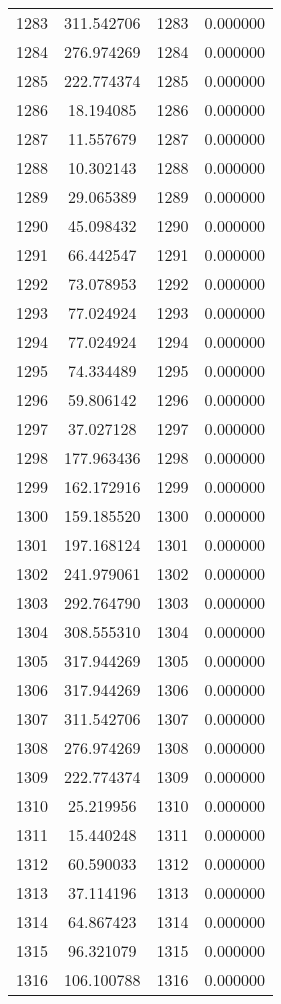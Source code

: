 \documentclass[12pt]{article}
\begin{document}
\begin{longtable}{@{}cccc@{}}
1283 & 311.542706 & 1283 & 0.000000 \\
1284 & 276.974269 & 1284 & 0.000000 \\
1285 & 222.774374 & 1285 & 0.000000 \\
1286 & 18.194085 & 1286 & 0.000000 \\
1287 & 11.557679 & 1287 & 0.000000 \\
1288 & 10.302143 & 1288 & 0.000000 \\
1289 & 29.065389 & 1289 & 0.000000 \\
1290 & 45.098432 & 1290 & 0.000000 \\
1291 & 66.442547 & 1291 & 0.000000 \\
1292 & 73.078953 & 1292 & 0.000000 \\
1293 & 77.024924 & 1293 & 0.000000 \\
1294 & 77.024924 & 1294 & 0.000000 \\
1295 & 74.334489 & 1295 & 0.000000 \\
1296 & 59.806142 & 1296 & 0.000000 \\
1297 & 37.027128 & 1297 & 0.000000 \\
1298 & 177.963436 & 1298 & 0.000000 \\
1299 & 162.172916 & 1299 & 0.000000 \\
1300 & 159.185520 & 1300 & 0.000000 \\
1301 & 197.168124 & 1301 & 0.000000 \\
1302 & 241.979061 & 1302 & 0.000000 \\
1303 & 292.764790 & 1303 & 0.000000 \\
1304 & 308.555310 & 1304 & 0.000000 \\
1305 & 317.944269 & 1305 & 0.000000 \\
1306 & 317.944269 & 1306 & 0.000000 \\
1307 & 311.542706 & 1307 & 0.000000 \\
1308 & 276.974269 & 1308 & 0.000000 \\
1309 & 222.774374 & 1309 & 0.000000 \\
1310 & 25.219956 & 1310 & 0.000000 \\
1311 & 15.440248 & 1311 & 0.000000 \\
1312 & 60.590033 & 1312 & 0.000000 \\
1313 & 37.114196 & 1313 & 0.000000 \\
1314 & 64.867423 & 1314 & 0.000000 \\
1315 & 96.321079 & 1315 & 0.000000 \\
1316 & 106.100788 & 1316 & 0.000000 \\

\end{longtable}
\end{document}
